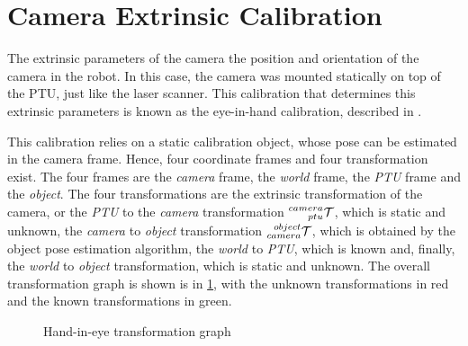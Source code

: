\section{Camera Extrinsic Calibration}
\label{section:camera-extrinsic-calibration}

The extrinsic parameters of the camera the position and orientation of the camera in the robot. In this case, the camera was mounted statically on top of the PTU, just like the laser scanner. This calibration that determines this extrinsic parameters is known as the eye-in-hand calibration, described in \cite{horaud95}.

This calibration relies on a static calibration object, whose pose can be estimated in the camera frame. Hence, four coordinate frames and four transformation exist. The four frames are the \emph{camera} frame, the \emph{world} frame, the \emph{PTU} frame and the \emph{object}. The four transformations are the extrinsic transformation of the camera, or the \emph{PTU} to the \emph{camera} transformation $\TF{ptu}{camera}$, which is static and unknown, the \emph{camera} to \emph{object} transformation $\TF{camera}{object}$, which is obtained by the object pose estimation algorithm, the \emph{world} to \emph{PTU}, which is known and, finally, the \emph{world} to \emph{object} transformation, which is static and unknown. The overall transformation graph is shown is in \cref{fig:hand-in-eye-tf-graph}, with the unknown transformations in red and the known transformations in green.

\begin{figure}
    
    \centering

    \caption{Hand-in-eye transformation graph}
    \label{fig:hand-in-eye-tf-graph}

\end{figure}


